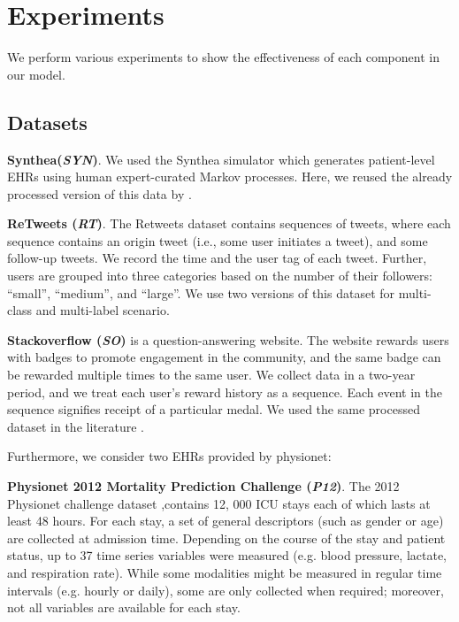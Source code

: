 \documentclass[journal,twoside,web]{ieeecolor}
\begin{document}
\section{Experiments}
\label{sec:Experiments}

We perform various experiments to show the effectiveness of each component in our model.
\subsection*{Datasets}

\textbf{Synthea(\emph{SYN})}.
We used the Synthea simulator \cite*{walonoskiSyntheaApproachMethod2018} which generates patient-level EHRs using human expert-curated Markov processes. Here, we reused the already processed version of this data by \cite*{enguehardNeuralTemporalPoint2020}.

\textbf{ReTweets (\emph{RT})}.
The Retweets dataset contains sequences of tweets, where each sequence contains an origin tweet (i.e., some user initiates a tweet), and some follow-up tweets. We record the time and the user tag of each tweet. Further, users are grouped into three categories based on the number of their followers: “small”, “medium”, and “large”. We use two versions of this dataset for multi-class \cite*{zhangSelfAttentiveHawkesProcess2020} and multi-label \cite*{enguehardNeuralTemporalPoint2020} scenario.

\textbf{Stackoverflow (\emph{SO})} is a question-answering website. The website rewards users with badges to promote engagement in the community, and the same badge can be rewarded multiple times to the same user. We collect data in a two-year period, and we treat each user’s reward history as a sequence. Each event in the sequence signifies receipt of a particular medal. We used the same processed dataset in the literature \cite*{zuoTransformerHawkesProcess2020a}.

Furthermore, we consider two EHRs provided by physionet:

\textbf{Physionet 2012 Mortality Prediction Challenge (\emph{P12})}.
The 2012 Physionet challenge dataset \cite*{silvaPredictingInHospitalMortality},contains 12, 000 ICU stays each of which lasts at least 48 hours. For each stay, a set of general descriptors (such as gender or age) are collected at admission time. Depending on the course of the stay and patient status, up to 37 time series variables were measured (e.g. blood pressure, lactate, and respiration rate). While some modalities might be measured in regular time intervals (e.g. hourly or daily), some are only collected when required; moreover, not all variables are available for each stay.
\end{document}

